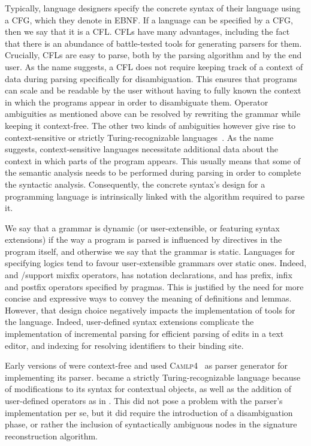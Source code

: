Typically, language designers specify the concrete syntax of their language using a \ac{CFG}, which they denote in \ac{EBNF}.
If a language can be specified by a \ac{CFG}, then we say that it is a \ac{CFL}.
\Acp{CFL} have many advantages, including the fact that there is an abundance of battle-tested tools for generating parsers for them.
Crucially, \acp{CFL} are easy to parse, both by the parsing algorithm and by the end user.
As the name suggests, a \ac{CFL} does not require keeping track of a context of data during parsing specifically for disambiguation.
This ensures that programs can scale and be readable by the user without having to fully known the context in which the programs appear in order to disambiguate them.
Operator ambiguities as mentioned above can be resolved by rewriting the grammar while keeping it context-free.
The other two kinds of ambiguities however give rise to context-sensitive or strictly Turing-recognizable languages~\cite{chomsky1956three}.
As the name suggests, context-sensitive languages necessitate additional data about the context in which parts of the program appears.
This usually means that some of the semantic analysis needs to be performed during parsing in order to complete the syntactic analysis.
Consequently, the concrete syntax's design for a programming language is intrinsically linked with the algorithm required to parse it.


We say that a grammar is dynamic (or user-extensible, or featuring syntax extensions) if the way a program is parsed is influenced by directives in the program itself, and otherwise we say that the grammar is static.
Languages for specifying logics tend to favour user-extensible grammars over static ones.
Indeed, \Agda and \Isabelle/\HOL support mixfix operators, \Coq has notation declarations, and \Beluga has prefix, infix and postfix operators specified by pragmas.
This is justified by the need for more concise and expressive ways to convey the meaning of definitions and lemmas.
However, that design choice negatively impacts the implementation of tools for the language.
Indeed, user-defined syntax extensions complicate the implementation of incremental parsing for efficient parsing of edits in a text editor, and indexing for resolving identifiers to their binding site.

Early versions of \Beluga were context-free and used \textsc{Camlp4}~\cite{de2003camlp4} as parser generator for implementing its parser.
\Beluga became a strictly Turing-recognizable language because of modifications to its syntax for contextual objects, as well as the addition of user-defined operators as in \Twelf.
This did not pose a problem with the parser's implementation per se, but it did require the introduction of a disambiguation phase, or rather the inclusion of syntactically ambiguous nodes in the signature reconstruction algorithm.


